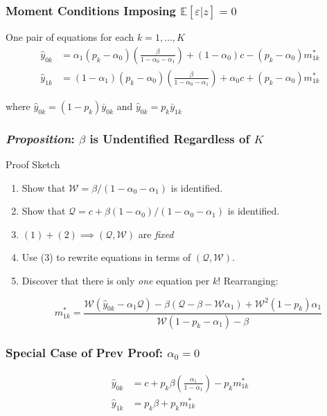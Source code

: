 \documentclass{beamer}
\begin{document}
\begin{frame}
  \frametitle{Moment Conditions Imposing $\mathbb{E}[\varepsilon|z]=0$}
  One pair of equations for each $k = 1, \dots, K$
\begin{align*}
  \hat{y}_{0k} &=\alpha_1(p_k - \alpha_0)\left(\frac{\beta}{1 - \alpha_0 - \alpha_1}\right) + (1-\alpha_0)c - (p _k -  \alpha_0)m_{1k}^* \\[1.5ex]
  \label{eq:MC1IV}
  \hat{y}_{1k} &=(1-\alpha_1)(p_k - \alpha_0)\left(\frac{\beta}{1 - \alpha_0 - \alpha_1}\right) + \alpha_0 c + (p _k -  \alpha_0)m_{1k}^*
\end{align*}

\vspace{0.5em}
where $\hat{y}_{0k}=(1-p_k)\bar{y}_{0k}$ and $\hat{y}_{0k}=p_k\bar{y}_{1k}$


\vspace{2em} 

\hfill \alert{}
\end{frame}
\begin{frame}
  \frametitle{\emph{Proposition}: $\beta$ is Undentified Regardless of $K$}
  \begin{block}{Proof Sketch}
    \begin{enumerate}[(1)]
      \item Show that $\mathcal{W}= \beta/(1-\alpha_0 - \alpha_1)$ is identified. 
      \item Show that $\mathcal{Q} = c + \beta(1-\alpha_0)/(1-\alpha_0-\alpha_1)$ is identified.
      \item $(1) + (2) \implies (\mathcal{Q}, \mathcal{W})$ are \emph{fixed}
      \item Use (3) to rewrite equations in terms of $(\mathcal{Q}, \mathcal{W})$.
      \item Discover that there is only \emph{one} equation per $k$! Rearranging: 

        \[m^*_{1k} = \frac{\mathcal{W}(\hat{y}_{0k}-\alpha_1 \mathcal{Q}) - \beta(\mathcal{Q}-\beta-\mathcal{W}\alpha_1) + \mathcal{W}^2(1-p_k)\alpha_1}{\mathcal{W}(1-p_k - \alpha_1) - \beta}\]
    \end{enumerate}

  \end{block} 
    
\end{frame}
\begin{frame}
  \frametitle{Special Case of Prev Proof: $\alpha_0 = 0$}
\begin{align*}
  \hat{y}_{0k} &=c + p_k \beta \left(\frac{\alpha_1}{1 -  \alpha_1}\right) - p _k m_{1k}^* \\[1.5ex]
  \hat{y}_{1k} &=p_k \beta + p _k m_{1k}^*
\end{align*}
\end{frame}
\end{document}
